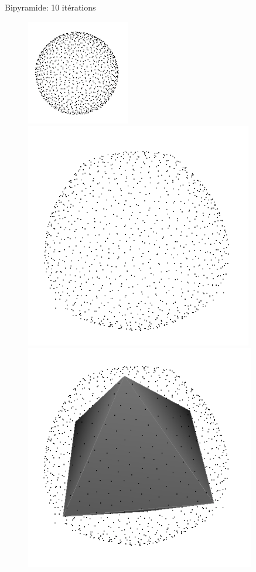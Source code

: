 \documentclass{beamer}
\begin{document}
\begin{frame}[allowframebreaks]
    Bipyramide: 10 itérations
    \begin{figure}
        \centering
        \includegraphics[scale=0.4]{img/sphere-cube-0}
        \includegraphics[scale=0.2]{img/sphere-bipyramid-10}
        \includegraphics[scale=0.2]{img/sphere-bipyramid-bipyramid}
    \end{figure}
\end{frame}
\end{document}
